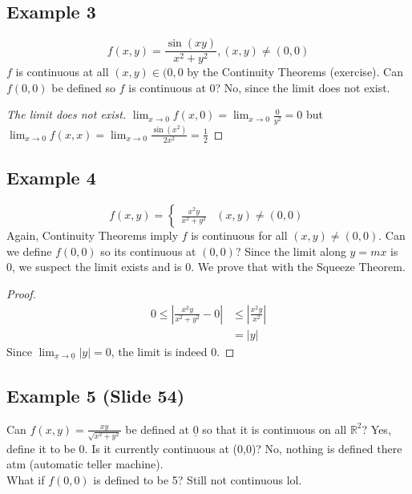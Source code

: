\documentclass[12pt]{article}
\theoremstyle{definition}
\newcommand{\R}{\mathbb{R}}
\begin{document}
\subsection*{Example 3}
\[f(x,y)=\frac{\sin(xy)}{x^2+y^2}, (x,y)\neq (0,0)\] $f$ is continuous at all $(x,y)\in (0,0$ by the Continuity Theorems (exercise). Can $f(0,0)$ be defined so $f$ is continuous at 0? No, since the limit does not exist.
\begin{proof}[The limit does not exist]
    $\lim_{x\to 0} f(x,0)=\lim_{x\to 0}\frac{0}{y^2}=0$ but $\lim_{x\to 0}f(x,x)=\lim_{x\to 0}\frac{\sin(x^2)}{2x^2}=\frac{1}{2}$
\end{proof}

\subsection*{Example 4}
\[f(x,y)=\begin{cases}\frac{x^2y}{x^2+y^2}&(x,y)\neq (0,0)\end{cases}\]
Again, Continuity Theorems imply $f$ is continuous for all $(x,y)\neq (0,0)$. Can we define $f(0,0)$ so its continuous at $(0,0)$? Since the limit along $y=mx$ is 0, we suspect the limit exists and is 0. We prove that with the Squeeze Theorem.
\begin{proof}
    \begin{align*}
        0\leq |\frac{x^2y}{x^2+y^2}-0|&\leq|\frac{x^2y}{x^2}|\\
        &=|y|
    \end{align*}
    Since $\lim_{\underline x\to \underline 0}|y|=0$, the limit is indeed 0.
\end{proof}

\subsection*{Example 5 (Slide 54)}
Can $f(x,y)=\frac{xy}{\sqrt{x^2+y^2}}$ be defined at $\underline 0$ so that it is continuous on all $\R^2$? Yes, define it to be 0. Is it currently continuous at (0,0)? No, nothing is defined there atm (automatic teller machine).\\
What if $f(0,0)$ is defined to be 5? Still not continuous lol.
\end{document}
